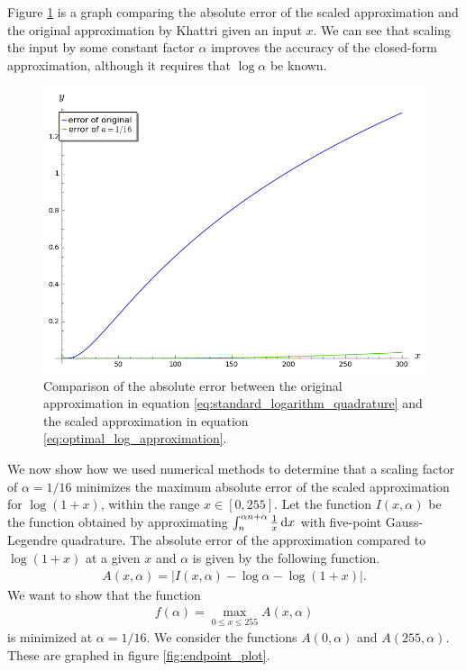 Figure \ref{fig:log_error_comparison} is a graph comparing the absolute error of the scaled approximation and the original approximation by Khattri given an input $x$. We can see that scaling the input by some constant factor $\alpha$ improves the accuracy of the closed-form approximation, although it requires that $\log \alpha$ be known.

\begin{figure}[!ht]
		\centering
		\includegraphics[width=.9\linewidth]{figures/log_error_comparison.png}
		\caption{Comparison of the absolute error between the original approximation in equation \ref{eq:standard_logarithm_quadrature} and the scaled approximation in equation \ref{eq:optimal_log_approximation}.}
		\label{fig:log_error_comparison}
\end{figure}

We now show how we used numerical methods to determine that a scaling factor of $\alpha = 1/16$ minimizes the maximum absolute error of the scaled approximation for $\log{(1+x)}$, within the range $x \in [0, 255]$.
Let the function $I(x,\alpha)$ be the function obtained by approximating $\int_{n}^{\alpha n + \alpha}{\frac{1}{x}\mathop{}\!\mathrm{d} x}$ with five-point Gauss-Legendre quadrature. The absolute error of the approximation compared to  $\log{(1+x)}$ at a given $x$ and $\alpha$ is given by the following function.
\begin{align*}
	A(x,\alpha) = \left| I(x,\alpha) - \log\alpha - \log{(1+x)}\right|.
\end{align*}
We want to show that the function
\begin{align*}
	f(\alpha) = \max_{0\leq x \leq 255}{A(x,\alpha)}
\end{align*}
is minimized at $\alpha = 1/16$.
We consider the functions $A(0,\alpha)$ and $A(255,\alpha)$. These are graphed in figure \ref{fig:endpoint_plot}.

